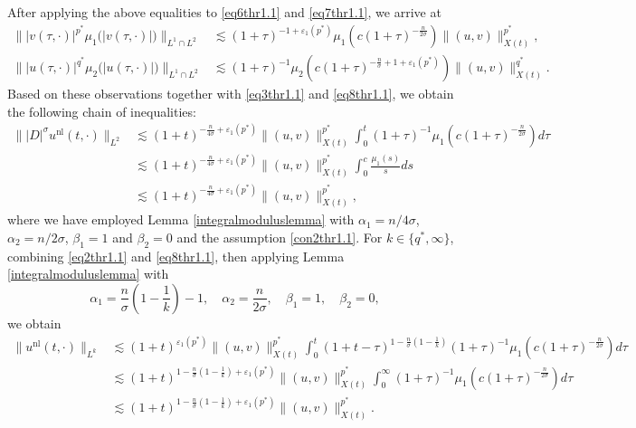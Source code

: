 \documentclass[11pt,reqno]{amsart}
\newcommand{\tron}[1]{\left( #1 \right)}
\numberwithin{equation}{section}
\begin{document}
After applying the above equalities to \eqref{eq6thr1.1} and \eqref{eq7thr1.1}, we arrive at
\begin{align}
\big\||v(\tau, \cdot)|^{p^*} \mu_1\big(|v(\tau, \cdot)|\big)\big\|_{L^1\cap L^2}&\lesssim (1+\tau)^{-1+\varepsilon_1(p^*)}\mu_1\tron{c(1+\tau)^{-\frac{n}{2\sigma}}}\|(u,v)\|^{p^*}_{X(t)},\label{eq8thr1.1}\\
\big\||u(\tau, \cdot)|^{q^*} \mu_2\big(|u(\tau, \cdot)|\big)\big\|_{L^1 \cap L^2}&\lesssim (1+\tau)^{-1}\mu_2\tron{c(1+\tau)^{-\frac{n}{\sigma}+1+\varepsilon_1(p^*)}}\|(u,v)\|^{q^*}_{X(t)}\label{eq9thr1.1}.
\end{align}
Based on these observations together with \eqref{eq3thr1.1} and \eqref{eq8thr1.1}, we obtain the following chain of inequalities:
\begin{align}
\big\||D|^{\sigma} u^{\mathrm{nl}}(t, \cdot)\big\|_{L^2} 
&\lesssim (1+t)^{-\frac{n}{4\sigma}+\varepsilon_1(p^*)} \|(u, v)\|_{X(t)}^{p^*} \int_0^{t} (1+\tau)^{-1} \mu_1\left(c(1+\tau)^{-\frac{n}{2\sigma}}\right) d \tau\nonumber \\
&\lesssim (1+t)^{-\frac{n}{4\sigma}+\varepsilon_1(p^*)} \|(u, v)\|_{X(t)}^{p^*} \int_0^c \frac{\mu_1(s)}{s} ds\nonumber \\
&\lesssim (1+t)^{-\frac{n}{4\sigma}+\varepsilon_1(p^*)} \|(u, v)\|_{X(t)}^{p^*},\label{eq10thr1.1}
\end{align}
where we have employed Lemma \ref{integralmoduluslemma} with $\alpha_1=n/4\sigma$, $\alpha_2=n/2\sigma$, $\beta_1=1$ and $\beta_2=0$ and the assumption \eqref{con2thr1.1}. For $k \in \{q^*, \infty\}$, combining \eqref{eq2thr1.1} and \eqref{eq8thr1.1}, then applying Lemma \ref{integralmoduluslemma} with
\[
\alpha_1 = \frac{n}{\sigma}\tron{1-\frac{1}{k}}-1,\quad  \alpha_2 = \frac{n}{2\sigma},\quad \beta_1 = 1,\quad \beta_2 = 0,
\]
we obtain
\begin{align}
\big\|u^{\mathrm{nl}}(t, \cdot)\big\|_{L^k} 
&\lesssim (1+t)^{\varepsilon_1(p^*)} \|(u, v)\|_{X(t)}^{p^*} \int_0^t (1+t-\tau)^{1-\frac{n}{\sigma}\left(1-\frac{1}{k}\right)} (1+\tau)^{-1} \mu_1\left(c(1+\tau)^{-\frac{n}{2\sigma}}\right) d\tau \nonumber\\
&\lesssim (1+t)^{1-\frac{n}{\sigma}\left(1-\frac{1}{k}\right)+\varepsilon_1(p^*)} \|(u, v)\|_{X(t)}^{p^*} \int_0^{\infty} (1+\tau)^{-1} \mu_1\left(c(1+\tau)^{-\frac{n}{2\sigma}}\right) d\tau \nonumber\\
&\lesssim (1+t)^{1-\frac{n}{\sigma}\left(1-\frac{1}{k}\right)+\varepsilon_1(p^*)} \|(u, v)\|_{X(t)}^{p^*}.\label{eq11thr1.1}
\end{align}
\end{document}
